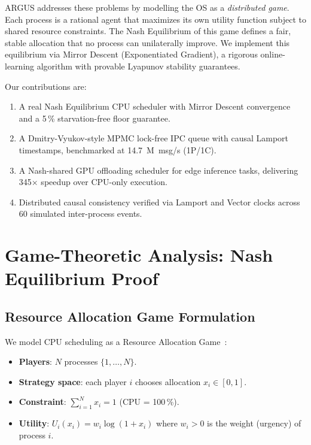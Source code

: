 \documentclass[sigconf]{acmart}
\begin{document}
ARGUS addresses these problems by modelling the OS as a \emph{distributed
game}.  Each process is a rational agent that maximizes its own utility
function subject to shared resource constraints.  The Nash Equilibrium of
this game defines a fair, stable allocation that no process can unilaterally
improve.  We implement this equilibrium via Mirror Descent (Exponentiated
Gradient), a rigorous online-learning algorithm with provable Lyapunov
stability guarantees.

Our contributions are:
\begin{enumerate}
  \item A real Nash Equilibrium CPU scheduler with Mirror Descent convergence
        and a 5\,\% starvation-free floor guarantee.
  \item A Dmitry-Vyukov-style MPMC lock-free IPC queue with causal
        Lamport timestamps, benchmarked at 14.7~M~msg/s (1P/1C).
  \item A Nash-shared GPU offloading scheduler for edge inference tasks,
        delivering 345$\times$ speedup over CPU-only execution.
  \item Distributed causal consistency verified via Lamport and Vector clocks
        across 60 simulated inter-process events.
\end{enumerate}

\section{Game-Theoretic Analysis: Nash Equilibrium Proof}
\label{sec:game-theory}

\subsection{Resource Allocation Game Formulation}

We model CPU scheduling as a Resource Allocation Game~\cite{monderer1996potential}:
\begin{itemize}
  \item \textbf{Players}: $N$ processes $\{1, \ldots, N\}$.
  \item \textbf{Strategy space}: each player $i$ chooses allocation $x_i \in [0,1]$.
  \item \textbf{Constraint}: $\sum_{i=1}^{N} x_i = 1$ (CPU = 100\,\%).
  \item \textbf{Utility}: $U_i(x_i) = w_i \log(1 + x_i)$ where $w_i > 0$
        is the weight (urgency) of process $i$.
\end{itemize}
\end{document}
